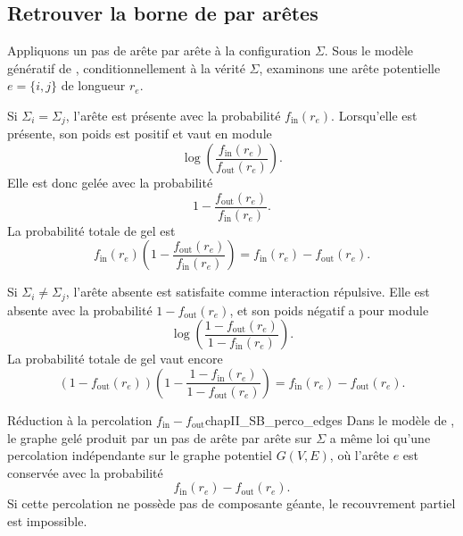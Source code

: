 
\subsection{Retrouver la borne de  par  arêtes}
\label{sec:chapII_SB_edges}

Appliquons un pas de \SW{} arête par arête à la configuration $\Sigma$. Sous le modèle génératif de \SB{}, conditionnellement à la vérité $\Sigma$, examinons une arête potentielle $e=\{i,j\}$ de longueur $r_e$.

Si $\Sigma_i=\Sigma_j$, l'arête est présente avec la probabilité $f_{\mathrm{in}}(r_e)$. Lorsqu'elle est présente, son poids est positif et vaut en module
\[
    \log\left(\frac{f_{\mathrm{in}}(r_e)}{f_{\mathrm{out}}(r_e)}\right).
\]
Elle est donc gelée avec la probabilité
\[
    1-\frac{f_{\mathrm{out}}(r_e)}{f_{\mathrm{in}}(r_e)}.
\]
La probabilité totale de gel est
\begin{equation}
    f_{\mathrm{in}}(r_e)
    \left(1-\frac{f_{\mathrm{out}}(r_e)}{f_{\mathrm{in}}(r_e)}\right)
    =
    f_{\mathrm{in}}(r_e)-f_{\mathrm{out}}(r_e).
    \label{eq:chapII_SB_edge_same}
\end{equation}

Si $\Sigma_i\neq\Sigma_j$, l'arête absente est satisfaite comme interaction répulsive. Elle est absente avec la probabilité $1-f_{\mathrm{out}}(r_e)$, et son poids négatif a pour module
\[
    \log\left(\frac{1-f_{\mathrm{out}}(r_e)}{1-f_{\mathrm{in}}(r_e)}\right).
\]
La probabilité totale de gel vaut encore
\begin{equation}
    \left(1-f_{\mathrm{out}}(r_e)\right)
    \left(1-\frac{1-f_{\mathrm{in}}(r_e)}{1-f_{\mathrm{out}}(r_e)}\right)
    =
    f_{\mathrm{in}}(r_e)-f_{\mathrm{out}}(r_e).
    \label{eq:chapII_SB_edge_diff}
\end{equation}

\begin{Corollaire}{Réduction à la percolation $f_{\mathrm{in}}-f_{\mathrm{out}}$}{chapII_SB_perco_edges}
Dans le modèle de \SB{}, le graphe gelé produit par un pas de \SW{} arête par arête sur $\Sigma$ a même loi qu'une percolation indépendante sur le graphe potentiel $G(V,E)$, où l'arête $e$ est conservée avec la probabilité
\begin{equation}
    f_{\mathrm{in}}(r_e)-f_{\mathrm{out}}(r_e).
    \label{eq:chapII_fin_fout}
\end{equation}
Si cette percolation ne possède pas de composante géante, le recouvrement partiel est impossible.
\end{Corollaire}

